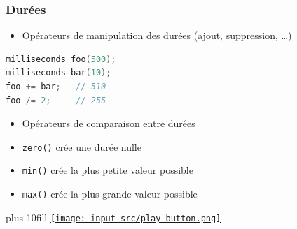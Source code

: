 \documentclass[C++.tex]{subfiles}
\begin{document}
\begin{frame}[fragile]
	\frametitle{Durées}
	\begin{itemize}
		\item Opérateurs de manipulation des durées (ajout, suppression, \ldots{})
	\end{itemize}

	\begin{lstlisting}[language=C++]
milliseconds foo(500);
milliseconds bar(10);
foo += bar;   // 510
foo /= 2;     // 255\end{lstlisting}

	\begin{itemize}
		\item Opérateurs de comparaison entre durées
		\item \lstinline|zero()| crée une durée nulle
		\item \lstinline|min()| crée la plus petite valeur possible
		\item \lstinline|max()| crée la plus grande valeur possible
	\end{itemize}

	\vskip 10mm plus 10fill
	\hfill
	\href{https://godbolt.org/#z:OYLghAFBqd5QCxAYwPYBMCmBRdBLAF1QCcAaPECAMzwBtMA7AQwFtMQByARg9KtQYEAysib0QXACx8BBAKoBnTAAUAHpwAMvAFYTStJg1DIApACYAQuYukl9ZATwDKjdAGFUtAK4sGe1wAyeAyYAHI%2BAEaYxCBmABykAA6oCoRODB7evnrJqY4CQSHhLFEx8baY9vkMQgRMxASZPn5cFVXptfUEhWGR0bEJCnUNTdmtQ109xaUDAJS2qF7EyOwc5gDMwcjeWADUJutuTkPEmKwH2CYaAIIbWzuY%2B4fICMQCqBdXtzfBBLssTGCEFmXxMAHYrDddvsIV9odChugQChXu9kSw6LQ8Eo0Ax0ApdvxUBAuGYNOSQetIdd4btEci0F4/gc3CzCahUAA6RmCYFPVmHXZgNYAVjcDGFB2ptPpKEWzMObKJ3MWvNmuwAVHSCEiUW8GKh0ZjsZhcfjkYlok5dQwfLsAPTa3UvfWGkAY2hYnECc0gS3Ea3IrAMflsyViiVrKlwmEAEVBUJh0vhspdaPdxu9eIJRIgIopUpjCJ1DNRBqNnpNZoJEXqJI0lOpRfZqH2lgOsd2teIhcTxed8tDguVPIIfJZYdF4sl0ZuzaJDo7uzMvZpKZLcqZQ7cLZVXjV26FU8jq%2Bh4Pjc8T4OT/dLruRCgAnkNMCwAPrbVDIADWyMcbDfZJfl2BVO1TMs3SfF930/H9kQNAB3YFT3XActwnQUCE5f9MDfVIGBWN9MGSF5gT3A8MJ3cNpyjZNz1BMEL2uDh5loTgRV4PwOC0UhDQ4Vl20sOlFmWR4Nh4UgCE0Fj5l/fN9E4SROOk3jOF4BQQA0STpPmOBYCQTBVFNJkSHISh6mABRlEMSohAQVAEK4iS0BYRI6CYaprJCWg7IcrieJctz6BiYAuFJUhAroaIAHkmV8xyVMM01rmISy1NIJLkFqfAuN4fhBBEMR2CkGRBEUFR1G4nQ9AMIwUGsax9DwCINNgZg2BACIOSGUgADd%2Bm4MEONmeZUESaoNI4ABaREO1MQSLDC9SRJWPREWCLzbPshLuF4AhTlWCSEOIJhEh0hSOA40h/N4PjsCM5ATOIXZVDiAA2Ka3skXZgGQZBdjCzkzF2CABKsSxSF2XBCBINt1i4WY9p0%2BYEDOLAYmBUg5K0tiOCU66VL49TNO0qqRousxlKq1SOCRsn5n64hUmcSQgA%3D%3D%3D}{\texttt{[image: input\_src/play-button.png]}}
\end{frame}
\end{document}
